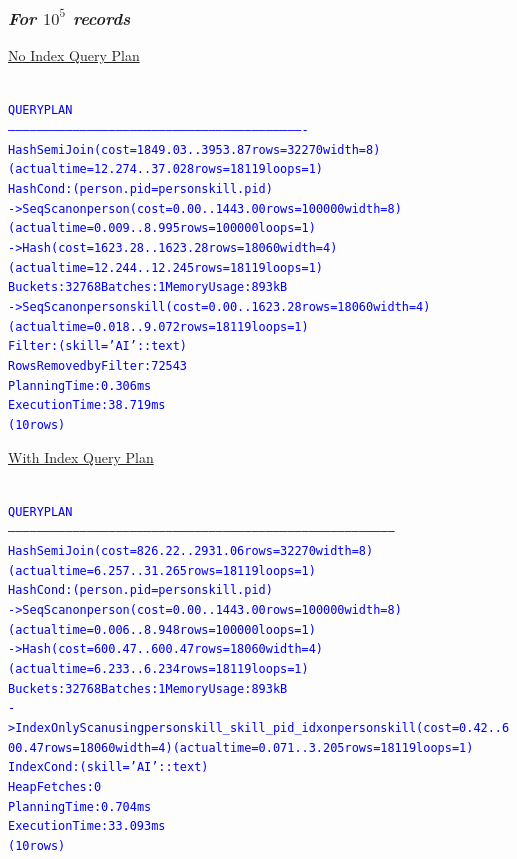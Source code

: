 \documentclass{article}
\begin{document}
    \subsubsection*{\emph{For $10^5$ records}}
    \underline{No Index Query Plan}
    \begin{center}
      {\tiny
      \begin{alltt}
      \textcolor{blue}{
        QUERY PLAN                                                         
        ----------------------------------------------------------------------------------------------------------------------------
         Hash Semi Join  (cost=1849.03..3953.87 rows=32270 width=8) (actual time=12.274..37.028 rows=18119 loops=1)
           Hash Cond: (person.pid = personskill.pid)
           ->  Seq Scan on person  (cost=0.00..1443.00 rows=100000 width=8) (actual time=0.009..8.995 rows=100000 loops=1)
           ->  Hash  (cost=1623.28..1623.28 rows=18060 width=4) (actual time=12.244..12.245 rows=18119 loops=1)
                 Buckets: 32768  Batches: 1  Memory Usage: 893kB
                 ->  Seq Scan on personskill  (cost=0.00..1623.28 rows=18060 width=4) (actual time=0.018..9.072 rows=18119 loops=1)
                       Filter: (skill = 'AI'::text)
                       Rows Removed by Filter: 72543
         Planning Time: 0.306 ms
         Execution Time: 38.719 ms
        (10 rows)
       }
      \end{alltt}
      }
    \end{center}
    \underline{With Index Query Plan}
    \begin{center}
      {\tiny
      \begin{alltt}
      \textcolor{blue}{
        QUERY PLAN                                                                            
        ------------------------------------------------------------------------------------------------------------------------------------------------------------------
         Hash Semi Join  (cost=826.22..2931.06 rows=32270 width=8) (actual time=6.257..31.265 rows=18119 loops=1)
           Hash Cond: (person.pid = personskill.pid)
           ->  Seq Scan on person  (cost=0.00..1443.00 rows=100000 width=8) (actual time=0.006..8.948 rows=100000 loops=1)
           ->  Hash  (cost=600.47..600.47 rows=18060 width=4) (actual time=6.233..6.234 rows=18119 loops=1)
                 Buckets: 32768  Batches: 1  Memory Usage: 893kB
                 ->  Index Only Scan using personskill_skill_pid_idx on personskill  (cost=0.42..600.47 rows=18060 width=4) (actual time=0.071..3.205 rows=18119 loops=1)
                       Index Cond: (skill = 'AI'::text)
                       Heap Fetches: 0
         Planning Time: 0.704 ms
         Execution Time: 33.093 ms
        (10 rows)
       }
      \end{alltt}
      }
    \end{center}
\end{document}
